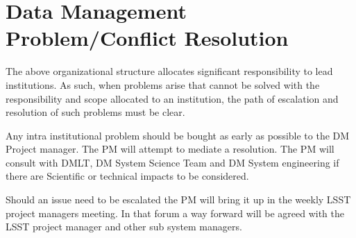 \section{Data Management Problem/Conflict Resolution }
The above organizational structure allocates significant responsibility to lead institutions.  As such, when problems arise that cannot be solved with the responsibility and scope allocated to an institution, the path of escalation and resolution of such problems must be clear. 

Any intra institutional problem should be bought as early as possible to the DM Project manager. The PM will attempt to mediate a resolution. The PM will consult with DMLT, DM System Science Team and DM System engineering if there are Scientific or technical impacts to be considered. 

Should an issue need to be escalated the PM will bring it up in the weekly LSST project managers meeting. 
In that forum a way forward will be agreed with the LSST project manager and other sub system managers.




